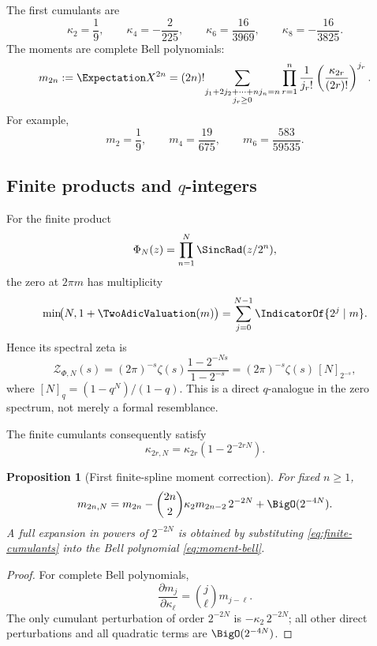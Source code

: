 \documentclass[11pt,oneside]{article}
\newtheorem{proposition}[theorem]{Proposition}
\theoremstyle{definition}
\theoremstyle{remark}
\begin{document}
The first cumulants are
\[
 \kappa_2=\frac19,\qquad
 \kappa_4=-\frac2{225},\qquad
 \kappa_6=\frac{16}{3969},\qquad
 \kappa_8=-\frac{16}{3825}.
\]
The moments are complete Bell polynomials:
\begin{equation}
 m_{2n}:=\Expectation X^{2n}
 =(2n)!\!
 \sum_{\substack{j_1+2j_2+\cdots+nj_n=n\\j_r\geq0}}
 \prod_{r=1}^{n}
 \frac1{j_r!}
 \left(\frac{\kappa_{2r}}{(2r)!}\right)^{j_r}.
 \label{eq:moment-bell}
\end{equation}
For example,
\[
 m_2=\frac19,\qquad
 m_4=\frac{19}{675},\qquad
 m_6=\frac{583}{59535}.
\]

\subsection{Finite products and \(q\)-integers}

For the finite product
\[
 \Phi_N(z)=\prod_{n=1}^{N}\SincRad(z/2^n),
\]
the zero at \(2\pi m\) has multiplicity
\[
 \min\!\bigl(N,1+\TwoAdicValuation(m)\bigr)
 =\sum_{j=0}^{N-1}\IndicatorOf{2^j\mid m}.
\]
Hence its spectral zeta is
\begin{equation}
 \mathcal Z_{\Phi,N}(s)
 =(2\pi)^{-s}\zeta(s)
   \frac{1-2^{-Ns}}{1-2^{-s}}
 =(2\pi)^{-s}\zeta(s)\,[N]_{2^{-s}},
 \label{eq:finite-qinteger}
\end{equation}
where \([N]_q=(1-q^N)/(1-q)\).  This is a direct \(q\)-analogue in the
zero spectrum, not merely a formal resemblance.

The finite cumulants consequently satisfy
\begin{equation}
 \kappa_{2r,N}=\kappa_{2r}(1-2^{-2rN}).
 \label{eq:finite-cumulants}
\end{equation}

\begin{proposition}[First finite-spline moment correction]
\label{prop:moment-convergence}
For fixed \(n\geq1\),
\begin{equation}
 m_{2n,N}
 =m_{2n}
 -\binom{2n}{2}\kappa_2m_{2n-2}\,2^{-2N}
 +\BigO(2^{-4N}).
 \label{eq:moment-convergence}
\end{equation}
A full expansion in powers of \(2^{-2N}\) is obtained by substituting
\eqref{eq:finite-cumulants} into the Bell polynomial
\eqref{eq:moment-bell}.
\end{proposition}

\begin{proof}
For complete Bell polynomials,
\[
 \frac{\partial m_j}{\partial\kappa_\ell}
 =\binom j\ell m_{j-\ell}.
\]
The only cumulant perturbation of order \(2^{-2N}\) is
\(-\kappa_2\,2^{-2N}\); all other direct perturbations and all quadratic
terms are \(\BigO(2^{-4N})\).
\end{proof}
\end{document}
